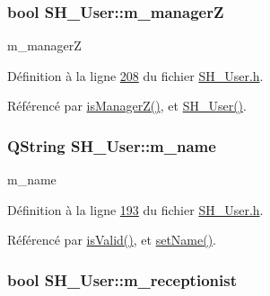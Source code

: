 \hypertarget{classSH__User_aff16f3d1a135c4b6673b69c42cffe86d}{
\subsubsection[{m\-\_\-manager\-Z}]{\setlength{\rightskip}{0pt plus 5cm}bool S\-H\-\_\-\-User\-::m\-\_\-manager\-Z\hspace{0.3cm}{\ttfamily [private]}}}\label{classSH__User_aff16f3d1a135c4b6673b69c42cffe86d}


m\-\_\-manager\-Z 



Définition à la ligne \hyperlink{SH__User_8h_source_l00208}{208} du fichier \hyperlink{SH__User_8h_source}{S\-H\-\_\-\-User.\-h}.



Référencé par \hyperlink{classSH__User_a763479597c54bb92ad2490826dedacfa}{is\-Manager\-Z()}, et \hyperlink{classSH__User_a96c0ebb3f11c1654935aaecb92295724}{S\-H\-\_\-\-User()}.

\hypertarget{classSH__User_abaf53f509224bdd7f8224259bffea2d6}{
\subsubsection[{m\-\_\-name}]{\setlength{\rightskip}{0pt plus 5cm}Q\-String S\-H\-\_\-\-User\-::m\-\_\-name\hspace{0.3cm}{\ttfamily [private]}}}\label{classSH__User_abaf53f509224bdd7f8224259bffea2d6}


m\-\_\-name 



Définition à la ligne \hyperlink{SH__User_8h_source_l00193}{193} du fichier \hyperlink{SH__User_8h_source}{S\-H\-\_\-\-User.\-h}.



Référencé par \hyperlink{classSH__User_a07de5c02b2a02b3bb2b0aaf0886bb4d9}{is\-Valid()}, et \hyperlink{classSH__User_af5037c555cb6fc44f2968ca2db35635f}{set\-Name()}.

\hypertarget{classSH__User_a86a5f8feb41c4238c5f022e9fbbe2e44}{
\subsubsection[{m\-\_\-receptionist}]{\setlength{\rightskip}{0pt plus 5cm}bool S\-H\-\_\-\-User\-::m\-\_\-receptionist\hspace{0.3cm}{\ttfamily [private]}}}\label{classSH__User_a86a5f8feb41c4238c5f022e9fbbe2e44}


